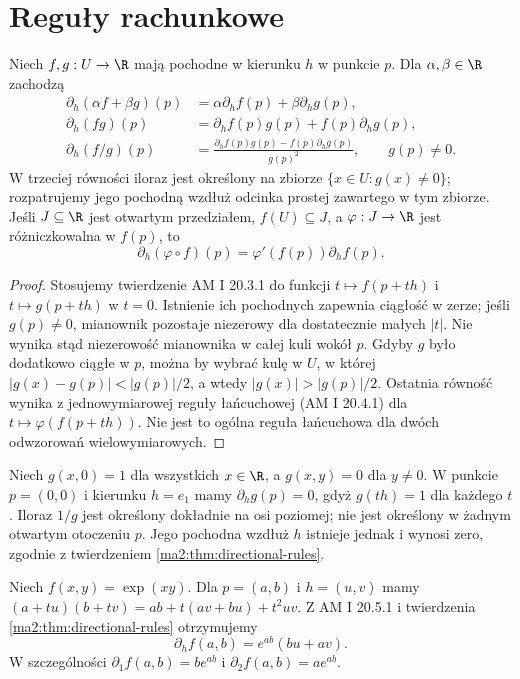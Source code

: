 \section{Reguły rachunkowe}

\begin{twierdzenie}
\label{ma2:thm:directional-rules}
Niech $f,g:U\to\R$ mają pochodne w kierunku $h$
w punkcie $p$. Dla $\alpha,\beta\in\R$ zachodzą
\begin{align*}
 \partial_h(\alpha f+\beta g)(p)
 &=\alpha\partial_hf(p)+\beta\partial_hg(p),\\
 \partial_h(fg)(p)
 &=\partial_hf(p)g(p)+f(p)\partial_hg(p),\\
 \partial_h(f/g)(p)
 &=\frac{\partial_hf(p)g(p)-f(p)\partial_hg(p)}
 {g(p)^2},\qquad g(p)\ne0.
\end{align*}
W trzeciej równości iloraz jest określony na zbiorze
$\{x\in U:g(x)\ne0\}$; rozpatrujemy jego pochodną
wzdłuż odcinka prostej zawartego w tym zbiorze.
Jeśli $J\subseteq\R$ jest otwartym przedziałem,
$f(U)\subseteq J$, a $\varphi:J\to\R$ jest
różniczkowalna w $f(p)$, to
\[
 \partial_h(\varphi\circ f)(p)
 =\varphi'(f(p))\partial_h f(p).
\]
\end{twierdzenie}
\begin{proof}
Stosujemy twierdzenie AM I 20.3.1 do funkcji
$t\mapsto f(p+th)$ i $t\mapsto g(p+th)$ w $t=0$.
Istnienie ich pochodnych zapewnia ciągłość w zerze;
jeśli $g(p)\ne0$, mianownik pozostaje niezerowy
dla dostatecznie małych $|t|$. Nie wynika stąd
niezerowość mianownika w całej kuli wokół $p$.
Gdyby $g$ było dodatkowo ciągłe w $p$, można by wybrać
kulę w $U$, w której $|g(x)-g(p)|<|g(p)|/2$,
a wtedy $|g(x)|>|g(p)|/2$.
Ostatnia równość
wynika z jednowymiarowej reguły łańcuchowej
(AM I 20.4.1) dla $t\mapsto\varphi(f(p+th))$.
Nie jest to ogólna reguła łańcuchowa dla dwóch
odwzorowań wielowymiarowych.
\end{proof}

\begin{przyklad}
\label{ma2:ex:directional-quotient-domain}
Niech $g(x,0)=1$ dla wszystkich $x\in\R$, a
$g(x,y)=0$ dla $y\ne0$. W punkcie $p=(0,0)$
i kierunku $h=e_1$ mamy $\partial_hg(p)=0$, gdyż
$g(th)=1$ dla każdego $t$. Iloraz $1/g$ jest
określony dokładnie na osi poziomej; nie jest określony
w żadnym otwartym otoczeniu $p$. Jego pochodna
wzdłuż $h$ istnieje jednak i wynosi zero, zgodnie
z twierdzeniem \ref{ma2:thm:directional-rules}.
\end{przyklad}

\begin{przyklad}
Niech $f(x,y)=\exp(xy)$. Dla $p=(a,b)$ i $h=(u,v)$
mamy $(a+tu)(b+tv)=ab+t(av+bu)+t^2uv$.
Z AM I 20.5.1 i twierdzenia \ref{ma2:thm:directional-rules}
otrzymujemy
\[
 \partial_h f(a,b)=e^{ab}(bu+av).
\]
W szczególności $\partial_1 f(a,b)=be^{ab}$
i $\partial_2 f(a,b)=ae^{ab}$.
\end{przyklad}

